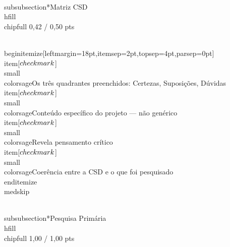 \documentclass[11pt, a4paper]{article}
\newcommand{\chipfull}[1]{\colorbox{sagedim}{\color{sage}\semibold\small\strut\ #1\ }}
\begin{document}
\\subsubsection*{Matriz CSD \\hfill {\\chipfull 0,42 / 0,50 pts}}

\\begin{itemize}[leftmargin=18pt,itemsep=2pt,topsep=4pt,parsep=0pt]
  \\item[$\\checkmark$] {\\small\\color{sage}Os três quadrantes preenchidos: Certezas, Suposições, Dúvidas}
  \\item[$\\checkmark$] {\\small\\color{sage}Conteúdo específico do projeto — não genérico}
  \\item[$\\checkmark$] {\\small\\color{sage}Revela pensamento crítico}
  \\item[$\\checkmark$] {\\small\\color{sage}Coerência entre a CSD e o que foi pesquisado}
\\end{itemize}
\\medskip

\\subsubsection*{Pesquisa Primária \\hfill {\\chipfull 1,00 / 1,00 pts}}
\end{document}
